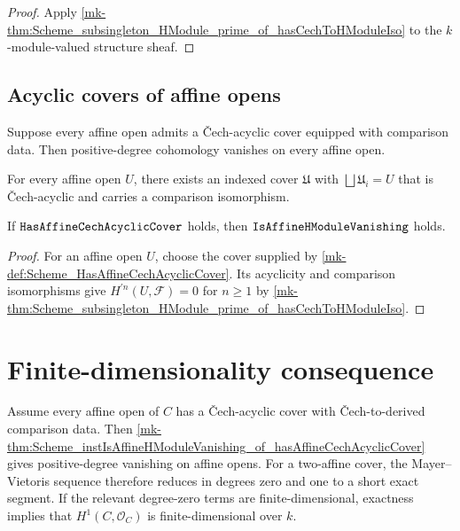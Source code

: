 \begin{proof}
  \leanok


Apply \ref{mk-thm:Scheme_subsingleton_HModule_prime_of_hasCechToHModuleIso} to the \(k\)-module-valued structure sheaf.
\end{proof}

\subsection{Acyclic covers of affine opens}

Suppose every affine open admits a \v{C}ech-acyclic cover equipped with comparison data. Then positive-degree cohomology vanishes on every affine open.

\begin{definition}\label{mk-def:Scheme_HasAffineCechAcyclicCover}
  \leanok


  For every affine open \(U\), there exists an indexed cover \(\mathfrak U\) with \(\bigsqcup \mathfrak U_i = U\) that is Čech-acyclic and carries a comparison isomorphism.
\end{definition}

\begin{theorem}\label{mk-thm:Scheme_instIsAffineHModuleVanishing_of_hasAffineCechAcyclicCover}
  \leanok


  If \(\mathtt{HasAffineCechAcyclicCover}\) holds, then \(\mathtt{IsAffineHModuleVanishing}\) holds.
\end{theorem}

\begin{proof}
  \leanok


For an affine open \(U\), choose the cover supplied by \ref{mk-def:Scheme_HasAffineCechAcyclicCover}. Its acyclicity and comparison isomorphisms give \(H^{\prime n}(U,\mathcal F)=0\) for \(n\geq1\) by \ref{mk-thm:Scheme_subsingleton_HModule_prime_of_hasCechToHModuleIso}.
\end{proof}

\section{Finite-dimensionality consequence}
\label{mk-sec:mv_use_in_project}

Assume every affine open of \(C\) has a \v{C}ech-acyclic cover with \v{C}ech-to-derived comparison data. Then \ref{mk-thm:Scheme_instIsAffineHModuleVanishing_of_hasAffineCechAcyclicCover} gives positive-degree vanishing on affine opens. For a two-affine cover, the Mayer--Vietoris sequence therefore reduces in degrees zero and one to a short exact segment. If the relevant degree-zero terms are finite-dimensional, exactness implies that \(H^1(C,\mathcal O_C)\) is finite-dimensional over \(k\).
